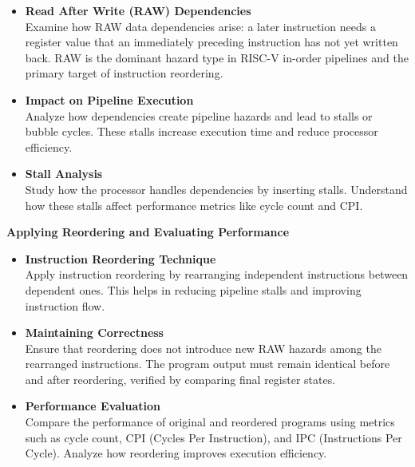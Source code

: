 \documentclass[11pt]{report}
\begin{document}
\begin{itemize}
\item \textbf{Read After Write (RAW) Dependencies} \\
Examine how RAW data dependencies arise: a later instruction needs a register value that an immediately preceding instruction has not yet written back. RAW is the dominant hazard type in RISC-V in-order pipelines and the primary target of instruction reordering.

\item \textbf{Impact on Pipeline Execution} \\
Analyze how dependencies create pipeline hazards and lead to stalls or bubble cycles. These stalls increase execution time and reduce processor efficiency.

\item \textbf{Stall Analysis} \\
Study how the processor handles dependencies by inserting stalls. Understand how these stalls affect performance metrics like cycle count and CPI.
\end{itemize}

\vspace{0.7cm}

\noindent
\textbf{Applying Reordering and Evaluating Performance}

\begin{itemize}
\item \textbf{Instruction Reordering Technique} \\
Apply instruction reordering by rearranging independent instructions between dependent ones. This helps in reducing pipeline stalls and improving instruction flow.

\item \textbf{Maintaining Correctness} \\
Ensure that reordering does not introduce new RAW hazards among the rearranged instructions. The program output must remain identical before and after reordering, verified by comparing final register states.

\item \textbf{Performance Evaluation} \\
Compare the performance of original and reordered programs using metrics such as cycle count, CPI (Cycles Per Instruction), and IPC (Instructions Per Cycle). Analyze how reordering improves execution efficiency.
\end{itemize}

\end{document}
